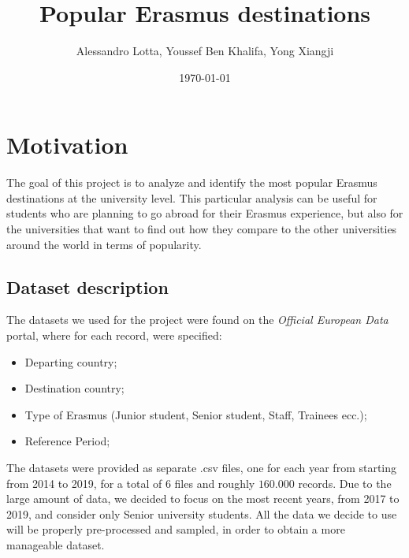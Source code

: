 
\usepackage{hyperref}
\title{Popular Erasmus destinations}
\author{Alessandro Lotta, Youssef Ben Khalifa, Yong Xiangji}
\date{\today}

\maketitle \tableofcontents 
\listofalgorithms
\newpage
\section{Motivation}
    The goal of this project is to analyze and identify the most popular Erasmus destinations at the university level. This particular analysis
    can be useful for students who are planning to go abroad for their Erasmus experience, but also for the universities that want to find out 
    how they compare to the other universities around the world in terms of popularity. 
\subsection{Dataset description}
    The datasets we used for the project were found on the \textit{Official European Data} portal, where for each record, were specified:
    \begin{itemize}
        \item Departing country;
        \item Destination country;
        \item Type of Erasmus (Junior student, Senior student, Staff, Trainees ecc.);
        \item Reference Period;
    \end{itemize}
    The datasets were provided as separate .csv files, one for each year from starting from 2014 to 2019, for a total of 6 files and roughly $160.000$ records.
    Due to the large amount of data, we decided to focus on the most recent years, from 2017 to 2019, and consider only Senior university students. All the data we decide 
    to use will be properly pre-processed and sampled, in order to obtain a more manageable dataset. 
